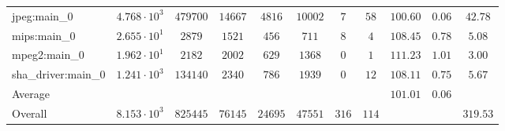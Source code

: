 \begin{tabular}{|l|c|c|c|c|c|c|c|c|c|c|}
jpeg:main\_0            & $ 4.768 \cdot 10^{3} $ & $ 479700 $ & $ 14667 $ & $ 4816  $ & $ 10002 $ & $ 7   $ & $ 58  $ & $ 100.60      $ & $ 0.06    $ & $ 42.78   $ \\
mips:main\_0            & $ 2.655 \cdot 10^{1} $ & $ 2879   $ & $ 1521  $ & $ 456   $ & $ 711   $ & $ 8   $ & $ 4   $ & $ 108.45      $ & $ 0.78    $ & $ 5.08    $ \\
mpeg2:main\_0           & $ 1.962 \cdot 10^{1} $ & $ 2182   $ & $ 2002  $ & $ 629   $ & $ 1368  $ & $ 0   $ & $ 1   $ & $ 111.23      $ & $ 1.01    $ & $ 3.00    $ \\
sha\_driver:main\_0     & $ 1.241 \cdot 10^{3} $ & $ 134140 $ & $ 2340  $ & $ 786   $ & $ 1939  $ & $ 0   $ & $ 12  $ & $ 108.11      $ & $ 0.75    $ & $ 5.67    $ \\
\hline
Average                 & $                    $ & $        $ & $       $ & $       $ & $       $ & $     $ & $     $ & $ 101.01      $ & $ 0.06    $ & $         $ \\
\hline
Overall                 & $ 8.153 \cdot 10^{3} $ & $ 825445 $ & $ 76145 $ & $ 24695 $ & $ 47551 $ & $ 316 $ & $ 114 $ & $             $ & $         $ & $ 319.53  $ \\
\hline
\end{tabular}
